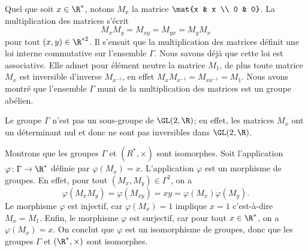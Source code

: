 Quel que soit $x\in\R^*$, notons $M_x$ la matrice $\mat{x & x \\ 0 & 0}$.
La multiplication des matrices s'écrit
\[
  M_xM_y = M_{xy} = M_{yx} = M_yM_x
\]
pour tout $(x,y)\in\R^{*2}$. Il s'ensuit que la multiplication des matrices
définit une loi interne commutative sur l'ensemble $\Gamma$. Nous savons déjà
que cette loi est associative.  Elle admet pour élément neutre la matrice $M_1$,
de plus toute matrice $M_x$ est inversible d'inverse $M_{x^{-1}}$, en effet $M_x
M_{x^{-1}} = M_{x x^{-1}} = M_1$.  Nous avons montré que l'ensemble $\Gamma$
muni de la multiplication des matrices est un groupe abélien.

Le groupe $\Gamma$ n'est pas un sous-groupe de $\GL(2,\R)$; en effet, les
matrices $M_x$ ont un déterminant nul et donc ne sont pas inversibles dans
$\GL(2,\R)$.

Montrons que les groupes $\Gamma$ et $(R^*,\times)$ sont isomorphes.
Soit l'application $\varphi\colon\Gamma\rightarrow\R^*$ définie par
$\varphi(M_x) = x$. L'application $\varphi$ est un morphisme de groupes. En
effet, pour tout $(M_x,M_y)\in\Gamma^2$, on a
\[
  \varphi(M_x M_y) = \varphi(M_{xy}) = xy = \varphi(M_x)\varphi(M_y).
\]
Le morphisme $\varphi$ est injectif, car $\varphi(M_x) = 1$ implique $x=1$
c'est-à-dire $M_x = M_1$. Enfin, le morphisme $\varphi$ est surjectif, car pour
tout $x\in\R^*$, on a $\varphi(M_x) = x$. On conclut que $\varphi$ est un
isomorphisme de groupes, donc que les groupes $\Gamma$ et $(\R^*,\times)$ sont
isomorphes.


